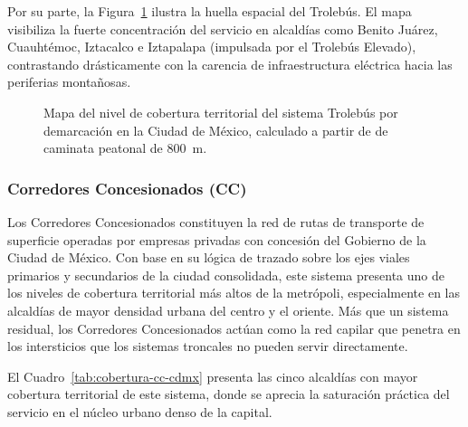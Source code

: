 Por su parte, la Figura~\ref{fig:mapa-cobertura-trole} ilustra la huella espacial
del Trolebús. El mapa visibiliza la fuerte concentración del servicio en alcaldías
como Benito Juárez, Cuauhtémoc, Iztacalco e Iztapalapa (impulsada por el Trolebús
Elevado), contrastando drásticamente con la carencia de infraestructura eléctrica
hacia las periferias montañosas.

\begin{figure}[H]
    \centering
    \caption[Mapa de cobertura territorial del Trolebús en la CDMX]{Mapa del
    nivel de cobertura territorial del sistema Trolebús por demarcación en la
    Ciudad de México, calculado a partir de  de caminata
    peatonal de 800~m.}
    \label{fig:mapa-cobertura-trole}
\end{figure}

\subsubsection{Corredores Concesionados (CC)}
\label{subsubsec:cobertura-cc}

Los Corredores Concesionados constituyen la red de rutas de transporte de
superficie operadas por empresas privadas con concesión del Gobierno de la Ciudad
de México. Con base en su lógica de trazado sobre los ejes viales primarios y
secundarios de la ciudad consolidada, este sistema presenta uno de los niveles de
cobertura territorial más altos de la metrópoli, especialmente en las alcaldías de
mayor densidad urbana del centro y el oriente. Más que un sistema residual, los
Corredores Concesionados actúan como la red capilar que penetra en los intersticios
que los sistemas troncales no pueden servir directamente.

El Cuadro~\ref{tab:cobertura-cc-cdmx} presenta las cinco alcaldías con mayor
cobertura territorial de este sistema, donde se aprecia la saturación práctica del
servicio en el núcleo urbano denso de la capital.


